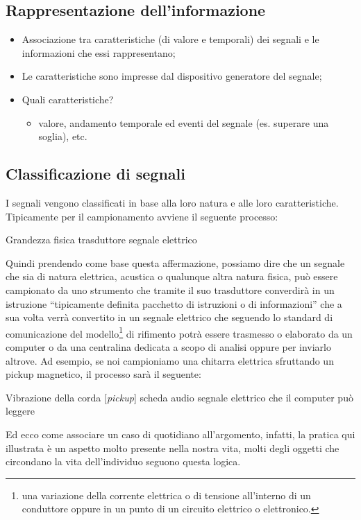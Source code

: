 \subsection{Rappresentazione dell'informazione}
\label{sec:rappredellinfo}
\begin{itemize}
\item Associazione tra caratteristiche (di valore e temporali) dei segnali
  e le informazioni che essi rappresentano;
\item Le caratteristiche sono impresse dal dispositivo generatore del
  segnale;
\item Quali caratteristiche?
  \begin{itemize}
  \item valore, andamento temporale ed eventi del segnale (es.
    superare una soglia), etc.
  \end{itemize}
\end{itemize}
\subsection{Classificazione di segnali}
\label{sec:classsegn}
I segnali vengono classificati in base alla loro natura e alle loro caratteristiche.
Tipicamente per il campionamento avviene il seguente processo:
\begin{center}
  Grandezza fisica \textrightarrow{} trasduttore \textrightarrow{} segnale elettrico 
\end{center}
Quindi prendendo come base questa affermazione, possiamo dire che un segnale che sia
di natura elettrica, acustica o qualunque altra natura fisica, può essere campionato
da uno strumento che tramite il suo trasduttore converdirà in un istruzione
``tipicamente definita pacchetto di istruzioni o di informazioni'' che a sua volta
verrà convertito in un segnale elettrico che seguendo lo standard di comunicazione
del modello\footnote{una variazione della corrente elettrica o di tensione all'interno
  di un conduttore oppure in un punto di un circuito elettrico o elettronico.} di
rifimento potrà essere trasmesso o elaborato da un computer o da una centralina
dedicata a scopo di analisi oppure per inviarlo altrove. Ad esempio, se noi campioniamo
una chitarra elettrica sfruttando un pickup magnetico, il processo sarà il seguente:
\begin{center}
  Vibrazione della corda [\textit{pickup}] \textrightarrow{} scheda audio
  \textrightarrow{} segnale elettrico che il computer può leggere
\end{center}
Ed ecco come associare un caso di quotidiano all'argomento, infatti, la pratica qui
illustrata è un aspetto molto presente nella nostra vita, molti degli oggetti che
circondano la vita dell'individuo seguono questa logica.
